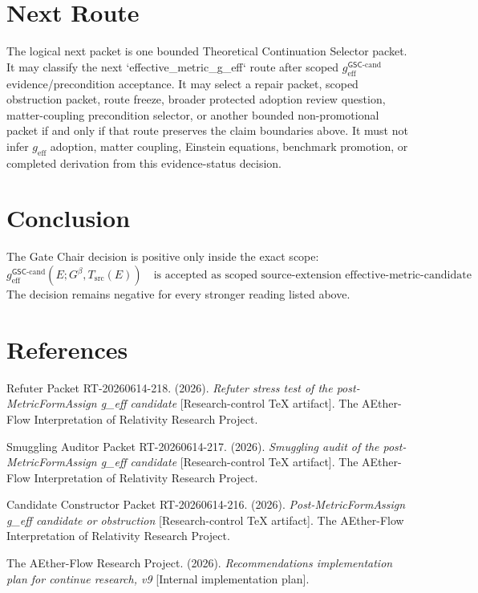\documentclass[11pt]{article}
\newcommand{\Gbeta}{G^\beta}
\newcommand{\geff}{g_{\mathrm{eff}}}
\newcommand{\geffCand}{g_{\mathrm{eff}}^{\mathsf{GSC}\mbox{-}\mathrm{cand}}}
\begin{document}
\section{Next Route}

The logical next packet is one bounded Theoretical Continuation Selector
packet. It may classify the next `effective_metric_g_eff` route after scoped
\(\geffCand\) evidence/precondition acceptance. It may select a repair packet,
scoped obstruction packet, route freeze, broader protected adoption review
question, matter-coupling precondition selector, or another bounded
non-promotional packet if and only if that route preserves the claim
boundaries above. It must not infer \(\geff\) adoption, matter coupling,
Einstein equations, benchmark promotion, or completed derivation from this
evidence-status decision.

\section{Conclusion}

The Gate Chair decision is positive only inside the exact scope:
\[
\geffCand(E;\Gbeta,T_{\mathrm{src}}(E))
\quad\text{is accepted as scoped source-extension effective-metric-candidate evidence/precondition.}
\]
The decision remains negative for every stronger reading listed above.

\section{References}

Refuter Packet RT-20260614-218. (2026). \emph{Refuter stress test of the
post-MetricFormAssign g\_eff candidate} [Research-control TeX artifact]. The
AEther-Flow Interpretation of Relativity Research Project.

Smuggling Auditor Packet RT-20260614-217. (2026). \emph{Smuggling audit of
the post-MetricFormAssign g\_eff candidate} [Research-control TeX artifact].
The AEther-Flow Interpretation of Relativity Research Project.

Candidate Constructor Packet RT-20260614-216. (2026). \emph{Post-MetricFormAssign
g\_eff candidate or obstruction} [Research-control TeX artifact]. The
AEther-Flow Interpretation of Relativity Research Project.

The AEther-Flow Research Project. (2026). \emph{Recommendations implementation
plan for continue research, v9} [Internal implementation plan].
\end{document}
